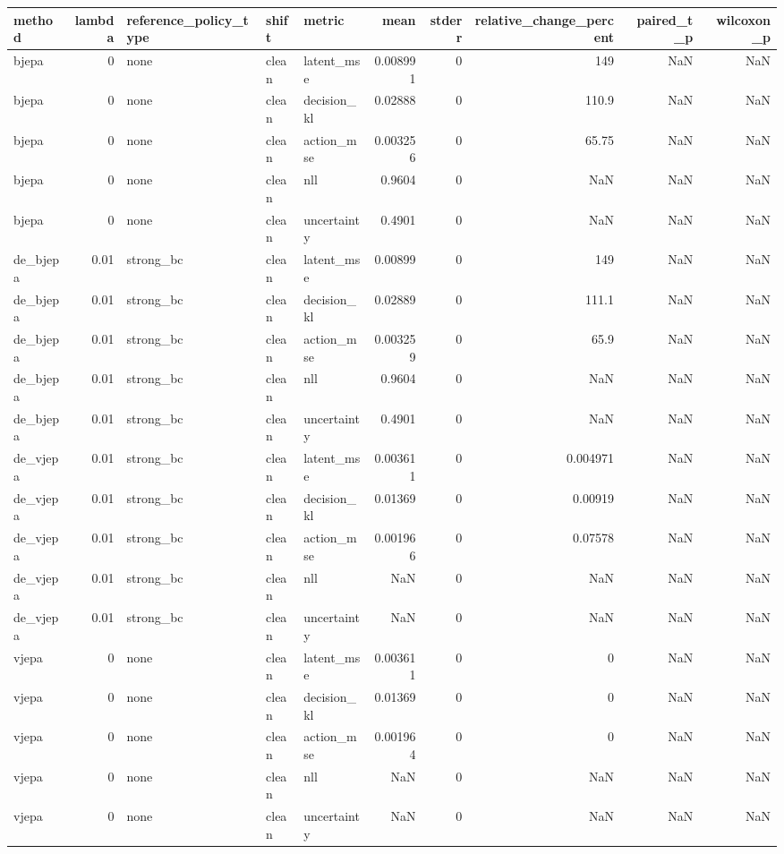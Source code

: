 \begin{tabular}{lrlllrrrrr}
\toprule
method & lambda & reference\_policy\_type & shift & metric & mean & stderr & relative\_change\_percent & paired\_t\_p & wilcoxon\_p \\
\midrule
bjepa & 0 & none & clean & latent\_mse & 0.008991 & 0 & 149 & NaN & NaN \\
bjepa & 0 & none & clean & decision\_kl & 0.02888 & 0 & 110.9 & NaN & NaN \\
bjepa & 0 & none & clean & action\_mse & 0.003256 & 0 & 65.75 & NaN & NaN \\
bjepa & 0 & none & clean & nll & 0.9604 & 0 & NaN & NaN & NaN \\
bjepa & 0 & none & clean & uncertainty & 0.4901 & 0 & NaN & NaN & NaN \\
de\_bjepa & 0.01 & strong\_bc & clean & latent\_mse & 0.00899 & 0 & 149 & NaN & NaN \\
de\_bjepa & 0.01 & strong\_bc & clean & decision\_kl & 0.02889 & 0 & 111.1 & NaN & NaN \\
de\_bjepa & 0.01 & strong\_bc & clean & action\_mse & 0.003259 & 0 & 65.9 & NaN & NaN \\
de\_bjepa & 0.01 & strong\_bc & clean & nll & 0.9604 & 0 & NaN & NaN & NaN \\
de\_bjepa & 0.01 & strong\_bc & clean & uncertainty & 0.4901 & 0 & NaN & NaN & NaN \\
de\_vjepa & 0.01 & strong\_bc & clean & latent\_mse & 0.003611 & 0 & 0.004971 & NaN & NaN \\
de\_vjepa & 0.01 & strong\_bc & clean & decision\_kl & 0.01369 & 0 & 0.00919 & NaN & NaN \\
de\_vjepa & 0.01 & strong\_bc & clean & action\_mse & 0.001966 & 0 & 0.07578 & NaN & NaN \\
de\_vjepa & 0.01 & strong\_bc & clean & nll & NaN & 0 & NaN & NaN & NaN \\
de\_vjepa & 0.01 & strong\_bc & clean & uncertainty & NaN & 0 & NaN & NaN & NaN \\
vjepa & 0 & none & clean & latent\_mse & 0.003611 & 0 & 0 & NaN & NaN \\
vjepa & 0 & none & clean & decision\_kl & 0.01369 & 0 & 0 & NaN & NaN \\
vjepa & 0 & none & clean & action\_mse & 0.001964 & 0 & 0 & NaN & NaN \\
vjepa & 0 & none & clean & nll & NaN & 0 & NaN & NaN & NaN \\
vjepa & 0 & none & clean & uncertainty & NaN & 0 & NaN & NaN & NaN \\
\bottomrule
\end{tabular}
